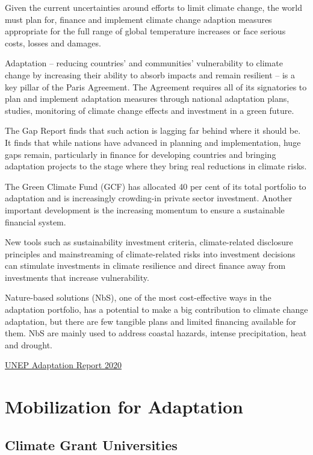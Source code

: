 \documentclass[
]{book}
\begin{document}
Given the current uncertainties around efforts to limit climate change,
the world must plan for, finance and implement climate change adaption measures
appropriate for the full range of global temperature increases or
face serious costs, losses and damages.

Adaptation -- reducing countries' and communities' vulnerability to climate change
by increasing their ability to absorb impacts and remain resilient --
is a key pillar of the Paris Agreement.
The Agreement requires all of its signatories to plan and implement adaptation measures
through national adaptation plans, studies, monitoring of climate change effects and
investment in a green future.

The Gap Report finds that such action is lagging far behind where it should be.
It finds that while nations have advanced in planning and implementation, huge gaps remain,
particularly in finance for developing countries and
bringing adaptation projects to the stage where they bring real reductions in climate risks.

The Green Climate Fund (GCF) has allocated 40 per
cent of its total portfolio to adaptation and is increasingly crowding-in private sector investment.
Another important development is the increasing momentum to ensure a sustainable financial
system.

New tools such as sustainability investment criteria, climate-related disclosure principles
and mainstreaming of climate-related risks into investment decisions can stimulate investments in
climate resilience and direct finance away from investments that increase vulnerability.

Nature-based solutions (NbS), one of the most cost-effective ways in the adaptation portfolio, has
a potential to make a big contribution to climate change adaptation, but there are few tangible
plans and limited financing available for them.
NbS are mainly used to address coastal hazards, intense precipitation, heat and
drought.

\href{https://www.unep.org/resources/adaptation-gap-report-2020}{UNEP Adaptation Report 2020}

\hypertarget{mobilization-for-adaptation}{%
\section{Mobilization for Adaptation}\label{mobilization-for-adaptation}}

\hypertarget{climate-grant-universities}{%
\subsection{Climate Grant Universities}\label{climate-grant-universities}}
\end{document}
